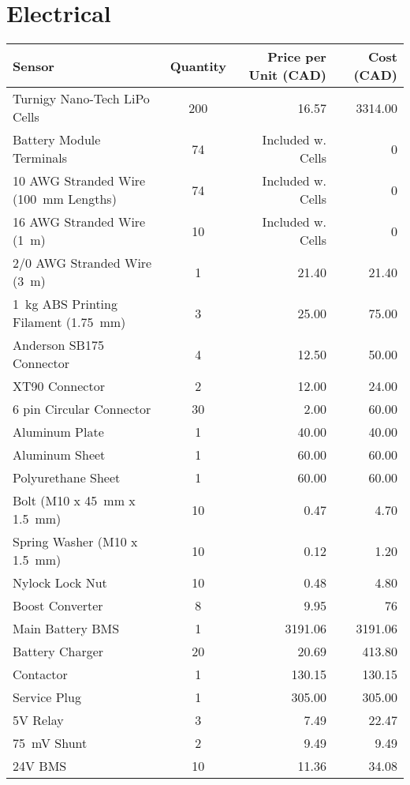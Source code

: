 \documentclass[main.tex]{subfiles}
\begin{document}
\section{Electrical}
\begin{table}[H]
  	  \centering
      \begin{tabular}{@{}lcrr@{}} \toprule
        Sensor & Quantity & Price per Unit (CAD) & Cost (CAD) \\ \midrule
        Turnigy Nano-Tech LiPo Cells& 200 & 16.57 & 3314.00 \\
        Battery Module Terminals& 74 & Included w. Cells & 0 \\
        10 AWG Stranded Wire (\SI{100}{mm} Lengths) & 74 & Included w. Cells & 0\\
        16 AWG Stranded Wire (\SI{1}{m}) & 10 & Included w. Cells & 0 \\
        2/0 AWG Stranded Wire (\SI{3}{m}) & 1 & 21.40 & 21.40 \\
        \SI{1}{kg} ABS Printing Filament (\SI{1.75}{mm})& 3 & 25.00 & 75.00 \\
        Anderson SB175 Connector& 4 & 12.50 &50.00 \\
        XT90 Connector& 2 & 12.00 & 24.00 \\
        6 pin Circular Connector& 30 &  2.00 &  60.00\\
        Aluminum Plate& 1 & 40.00 & 40.00 \\
        Aluminum Sheet& 1 & 60.00 & 60.00 \\
        Polyurethane Sheet& 1 & 60.00 & 60.00 \\
        Bolt (M10 x \SI{45}{mm} x \SI{1.5}{mm})& 10 & 0.47 & 4.70 \\
        Spring Washer (M10 x \SI{1.5}{mm})& 10 & 0.12 & 1.20 \\
        Nylock Lock Nut& 10 & 0.48 & 4.80\\
        Boost Converter& 8 & 9.95 & 76 \\
        Main Battery BMS& 1 & 3191.06 & 3191.06 \\
        Battery Charger& 20 & 20.69 & 413.80 \\
        Contactor& 1 & 130.15 & 130.15 \\
        Service Plug& 1 & 305.00 & 305.00 \\
        5V Relay & 3 & 7.49 & 22.47 \\
        \SI{75}{mV} Shunt& 2 & 9.49 & 9.49 \\
        24V BMS& 10 & 11.36 & 34.08 \\

\end{tabular}
\end{table}
\end{document}
